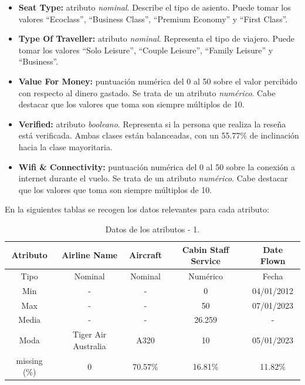 \documentclass[es]{uc3mreport}
\begin{document}
\begin{report}
\begin{itemize}
    \item \textbf{Seat Type:} atributo \textit{nominal}. Describe el tipo de asiento. Puede tomar los valores ``Ecoclass'',  ``Business Class'', ``Premium Economy'' y ``First Class''.
    \item \textbf{Type Of Traveller:} atributo \textit{nominal}. Representa el tipo de viajero. Puede tomar los valores ``Solo Leisure'', ``Couple Leisure'', ``Family Leisure'' y ``Business''.
    \item \textbf{Value For Money:} puntuación numérica del 0 al 50 sobre el valor percibido con respecto al dinero gastado. Se trata de un atributo \textit{numérico}. Cabe destacar que los valores que toma son siempre múltiplos de 10.
    \item \textbf{Verified:} atributo \textit{booleano}. Representa si la persona que realiza la reseña está verificada. Ambas clases están balanceadas, con un 55.77\% de inclinación hacia la clase mayoritaria.
    \item \textbf{Wifi \& Connectivity:} puntuación numérica del 0 al 50 sobre la conexión a internet durante el vuelo. Se trata de un atributo \textit{numérico}. Cabe destacar que los valores que toma son siempre múltiplos de 10.
\end{itemize}
En la siguientes tablas se recogen los datos relevantes para cada atributo:
\begin{table}[H]
    \center
    \begin{tabular}{@{}ccccc@{}}
        \toprule
        Atributo & Airline Name       & Aircraft & Cabin Staff Service & Date Flown \\
        \midrule
        Tipo     & Nominal            & Nominal  & Numérico            & Fecha      \\
        Min      & -                  & -        & 0                   & 04/01/2012 \\
        Max      & -                  & -        & 50                  & 07/01/2023 \\
        Media    & -                  & -        & 26.259              & -          \\
        Moda     & Tiger Air Australia& A320     & 10                  & 05/01/2023 \\
        missing (\%) & 0              & 70.57\%  & 16.81\%             & 11.82\%    \\
        \bottomrule
    \end{tabular}
    \caption{Datos de los atributos - 1.}
\end{table}


\end{report}
\end{document}
